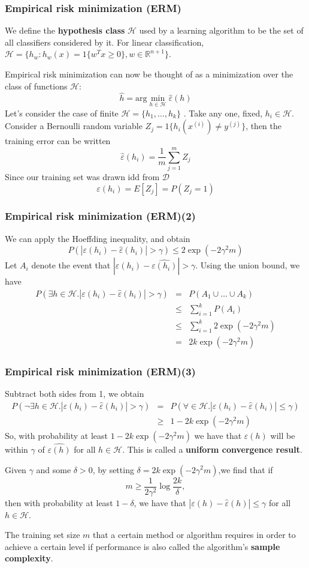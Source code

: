 \documentclass[slidestop,compress,mathserif]{beamer}
\begin{document}
	\begin{frame}[shrink]
		\frametitle{Empirical risk minimization (ERM)}
		We define the \textbf{hypothesis class} $\mathcal{H}$ used 
		by a learning algorithm to be the set of all classifiers
		considered by it. For linear classification, $\mathcal{H}=
		\{h_w:h_w(x)=1\{w^Tx \ge 0\},w\in\mathbb{R}^{n+1}\}$.
		
		Empirical risk minimization can now be thought of as a minimization over
		the class of functions $\mathcal{H}$:
		$$\hat{h}=\mathrm{arg}\min_{h\in\mathcal{H}}\hat{\varepsilon}(h)$$
		Let's consider the case of finite $\mathcal{H}=\{h_1,\ldots,h_k\}$
		. Take any one, fixed, $h_i\in \mathcal{H}$. Consider a Bernoulli
		random variable $Z_j=1\{h_i(x^{(i)})\neq y^{(j)}\}$, then the
		training error can be written
		$$\hat{\varepsilon}(h_i)=\frac{1}{m}\sum_{j=1}^mZ_j$$
		Since our training set was drawn idd from $\mathcal{D}$
		$$\varepsilon(h_i)=E[Z_j]=P(Z_j=1)$$
	\end{frame}	
	\begin{frame}[shrink]
		\frametitle{Empirical risk minimization (ERM)(2)}
		We can apply the Hoeffding inequality, and obtain
		$$P(|\varepsilon(h_i)-\hat{\varepsilon}(h_i)|>\gamma) \le 
		2\exp(-2\gamma^2m)$$
		Let $A_i$ denote the event that $|\varepsilon(h_i)-\hat{
		\varepsilon(h_i)}|>\gamma$. 
		Using the union bound, we have
		\begin{eqnarray*}
			P(\exists h \in \mathcal{H}.|\varepsilon(h_i)-
			\hat{\varepsilon}(h_i)|>\gamma) &=& P(A_1 \cup \ldots \cup
			A_k)\\
			&\le& \sum_{i=1}^kP(A_i)\\
			&\le& \sum_{i=1}^k2\exp(-2\gamma^2m)\\
			&=& 2k\exp(-2\gamma^2m)
		\end{eqnarray*}
		
	\end{frame}	
	\begin{frame}[shrink]
		\frametitle{Empirical risk minimization (ERM)(3)}
		Subtract both sides from 1, we obtain
		\begin{eqnarray*}
			P(\neg\exists h \in \mathcal{H}.|\varepsilon(h_i)-
			\hat{\varepsilon}(h_i)|>\gamma) &=& P(\forall \in \mathcal{H}.
			|\varepsilon(h_i)-\hat{\varepsilon}(h_i)|\le \gamma)\\
			&\ge& 1-2k\exp(-2\gamma^2m)
		\end{eqnarray*}
		So, with probability at least $1-2k\exp(-2\gamma^2m)$ we have
		that $\varepsilon(h)$ will be within $\gamma$ of $\hat{\varepsilon(h)}$
		for all $h \in \mathcal{H}$. This is called a \textbf{uniform
		convergence result}.
		
		Given $\gamma$ and some $\delta >0$, by setting $\delta = 
		2k\exp(-2\gamma^2m)$,we find that if
		$$m \ge \frac{1}{2\gamma^2}\log\frac{2k}{\delta},$$
		then with probability at least $1-\delta$, we have that
		$|\varepsilon(h)-\hat{\varepsilon}(h)| \le \gamma$ for all
		$h \in \mathcal{H}$.
		
		The training set size $m$ that a certain method or algorithm
		requires in order to achieve a certain level if performance
		is also called the algorithm's \textbf{sample complexity}.
		$$$$		
	\end{frame}
\end{document}
